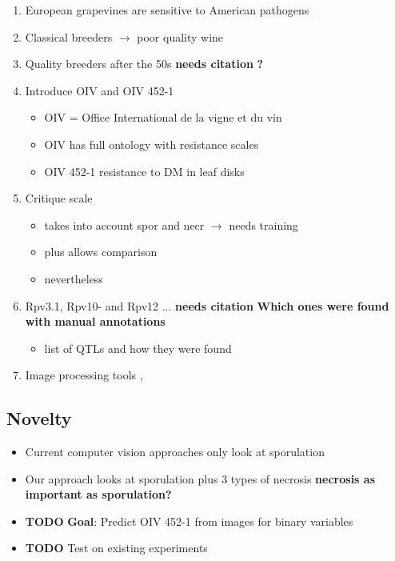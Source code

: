 \documentclass[english]{article}
\begin{document}
\begin{enumerate}
	\item European grapevines are sensitive to American pathogens~\parencite{fontaineEuropeBridgeheadWorldwide2021}
	\item Classical breeders $\rightarrow$ poor quality wine
	\item Quality breeders after the 50s \textbf{needs citation} \textbf{?}
	\item Introduce OIV and OIV 452-1
	      \begin{itemize}
		      \item OIV = Office International de la vigne et du vin
		      \item OIV has full ontology with resistance scales
		      \item OIV 452-1 resistance to DM in leaf disks
	      \end{itemize}
	\item Critique scale \parencite{possamaiPhenotypingQTLIdentification2022}
	      \begin{itemize}
		      \item takes into account spor and necr $\rightarrow$ needs training
		      \item plus allows comparison
		      \item nevertheless \parencite{possamaiPhenotypingQTLIdentification2022}
	      \end{itemize}
	\item Rpv3.1, Rpv10- and Rpv12 ... \textbf{needs citation} \textbf{Which ones were found with manual annotations}
	      \begin{itemize}
		      \item  \parencite{possamaiPhenotypingQTLIdentification2022} list of QTLs and how they were found
	      \end{itemize}
	\item Image processing tools \parencite{hernandezAssessmentDownyMildew2022}, \parencite{zendlerHighthroughputPhenotypingLeaf2021}
\end{enumerate}

\subsection{Novelty}

\begin{itemize}
	\item Current computer vision approaches only look at sporulation
	\item Our approach looks at sporulation plus 3 types of necrosis \textbf{necrosis as important as sporulation?}
	\item \textbf{TODO} \textbf{Goal}: Predict OIV 452-1 from images for binary variables
	\item \textbf{TODO} Test on existing experiments
\end{itemize}
\end{document}
